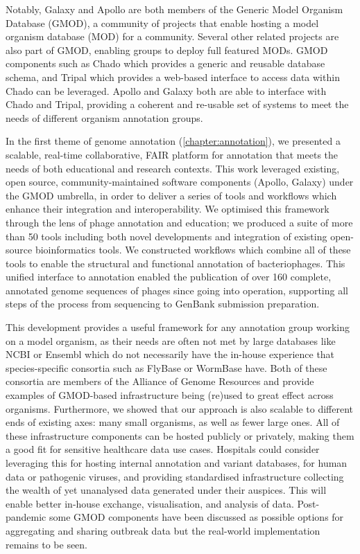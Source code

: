 Notably, Galaxy and Apollo are both members of the Generic Model Organism Database (GMOD)\cite{Stein_2002}, a community of projects that enable hosting a model organism database (MOD) for a community. Several other related projects are also part of GMOD, enabling groups to deploy full featured MODs. GMOD components such as Chado\cite{Mungall_2007} which provides a generic and reusable database schema, and Tripal\cite{Spoor_2019} which provides a web-based interface to access data within Chado can be leveraged. Apollo and Galaxy both are able to interface with Chado and Tripal, providing a coherent and re-usable set of systems to meet the needs of different organism annotation groups.

In the first theme of genome annotation (\cref{chapter:annotation}), we presented a scalable, real-time collaborative, FAIR platform for annotation that meets the needs of both educational and research contexts. This work leveraged existing, open source, community-maintained software components (Apollo, Galaxy) under the GMOD umbrella, in order to deliver a series of tools and workflows which enhance their integration and interoperability. We optimised this framework through the lens of phage annotation and education; we produced a suite of more than 50 tools including both novel developments and integration of existing open-source bioinformatics tools. We constructed workflows which combine all of these tools to enable the structural and functional annotation of bacteriophages. This unified interface to annotation enabled the publication of over 160 complete, annotated genome sequences of phages since going into operation, supporting all steps of the process from sequencing to GenBank submission preparation.

This development provides a useful framework for any annotation group working on a model organism, as their needs are often not met by large databases like NCBI or Ensembl which do not necessarily have the in-house experience that species-specific consortia such as FlyBase\cite{Thurmond_2018} or WormBase\cite{Davis_2022} have.
Both of these consortia are members of the Alliance of Genome Resources\cite{2024} and provide examples of GMOD-based infrastructure being (re)used to great effect across organisms.
Furthermore, we showed that our approach is also scalable to different ends of existing axes: many small organisms, as well as fewer large ones. All of these infrastructure components can be hosted publicly or privately, making them a good fit for sensitive healthcare data use cases.
Hospitals could consider leveraging this for hosting internal annotation and variant databases, for human data or pathogenic viruses, and providing standardised infrastructure collecting the wealth of yet unanalysed data generated under their auspices. This will enable better in-house exchange, visualisation, and analysis of data. Post-pandemic some GMOD components have been discussed as possible options for aggregating and sharing outbreak data but the real-world implementation remains to be seen.

